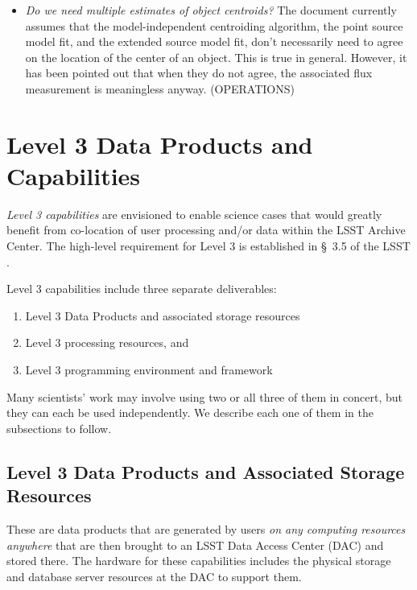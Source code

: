 \documentclass[SE,lsstdraft,toc]{lsstdoc}
\newcommand{\marginreq}[1]{\marginpar{\hspace{0pt}\tiny #1}}
\newcommand{\dmreq}[1]{\marginreq{DMS-REQ-#1}}
\newcommand{\ossreq}[1]{\marginreq{OSS-REQ-#1}}
\begin{document}
\begin{openissues}
\begin{itemize}
    \item \emph{Do we need multiple estimates of object centroids?} The document currently assumes that the model-independent centroiding algorithm, the point source model fit, and the extended source model fit, don't necessarily need to agree on the location of the center of an object. This is true in general. However, it has been pointed out that when they do not agree, the associated flux measurement is meaningless anyway. (OPERATIONS)

\end{itemize}
\end{openissues}

\clearpage

\section{Level 3 Data Products and Capabilities}
\label{sec:level3}

\emph{Level 3 capabilities} are envisioned to enable science cases that would greatly benefit from co-location of user processing and/or data within the LSST Archive Center. The high-level requirement for Level 3 is established in \S~3.5 of the LSST \SRD.
\ossreq{0140}

Level 3 capabilities include three separate deliverables:
%
\begin{enumerate}
    \item Level 3 Data Products and associated storage resources
    \item Level 3 processing resources, and
    \item Level 3 programming environment and framework
\end{enumerate}
%
Many scientists' work may involve using two or all three of them in concert, but they can each be used independently. We describe each one of them in the subsections to follow.

\subsection{Level 3 Data Products and Associated Storage Resources}

\dmreq{0290}
These are data products that are generated by users \emph{on any computing resources anywhere} that are then brought to an LSST Data Access Center (DAC) and stored there. The hardware for these capabilities includes the physical storage and database server resources at the DAC to support them.
\end{document}
